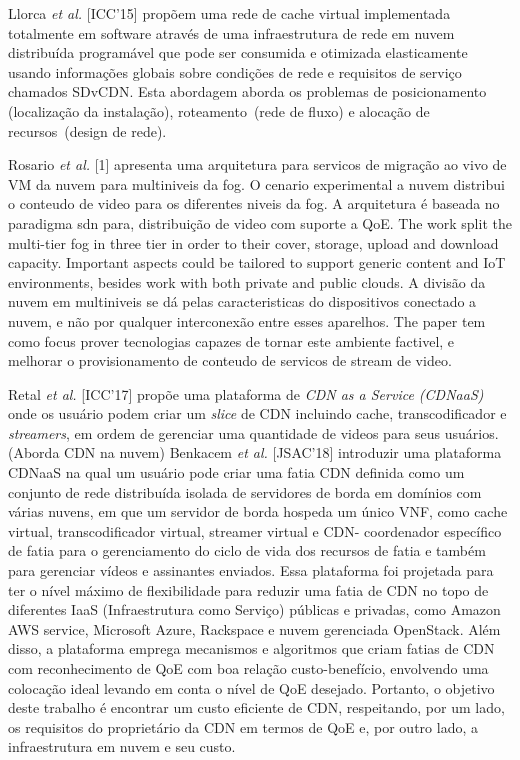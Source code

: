 Llorca \textit {et al.} [ICC'15] propõem uma rede de cache virtual implementada totalmente em software através de uma infraestrutura de rede em nuvem distribuída programável que pode ser consumida e otimizada elasticamente usando informações globais sobre condições de rede e requisitos de serviço chamados SDvCDN. Esta abordagem aborda os problemas de posicionamento (localização da instalação), roteamento~(rede de fluxo) e alocação de recursos~(design de rede).

Rosario \textit{et al.} [1] apresenta uma arquitetura para servicos de migração ao vivo de VM da nuvem para multiniveis da fog. O cenario experimental a nuvem distribui o conteudo de video para os diferentes niveis da fog. A arquitetura é baseada no paradigma sdn para, distribuição de video com suporte a QoE. 
The work split the multi-tier fog in three tier in order to their cover, storage, upload and download capacity. Important aspects could be tailored to support generic content and IoT environments, besides work with both private and public clouds. A divisão da nuvem em multiniveis se dá pelas caracteristicas do  dispositivos conectado a nuvem, e não por qualquer interconexão entre esses aparelhos. The paper tem como focus prover tecnologias capazes de tornar este ambiente factivel, e melhorar o provisionamento de conteudo de servicos de stream de video.


Retal \textit{et al.} [ICC'17] propõe uma plataforma de \textit{CDN as a Service (CDNaaS)} onde os usuário podem criar um \textit{slice} de CDN incluindo cache, transcodificador e \textit{streamers}, em ordem de gerenciar uma quantidade de videos para seus usuários. (Aborda CDN na nuvem)
Benkacem \textit{et al.} [JSAC'18] introduzir uma plataforma CDNaaS na qual um usuário pode criar uma fatia CDN definida como um conjunto de rede distribuída isolada de servidores de borda em domínios com várias nuvens, em que um servidor de borda hospeda um único VNF, como cache virtual, transcodificador virtual, streamer virtual e CDN- coordenador específico de fatia para o gerenciamento do ciclo de vida dos recursos de fatia e também para gerenciar vídeos e assinantes enviados. Essa plataforma foi projetada para ter o nível máximo de flexibilidade para reduzir uma fatia de CDN no topo de diferentes IaaS (Infraestrutura como Serviço) públicas e privadas, como Amazon AWS service, Microsoft Azure, Rackspace e nuvem gerenciada OpenStack. Além disso, a plataforma emprega mecanismos e algoritmos que criam fatias de CDN com reconhecimento de QoE com boa relação custo-benefício, envolvendo uma colocação ideal levando em conta o nível de QoE desejado. Portanto, o objetivo deste trabalho é encontrar um custo eficiente de CDN, respeitando, por um lado, os requisitos do proprietário da CDN em termos de QoE e, por outro lado, a infraestrutura em nuvem e seu custo.

